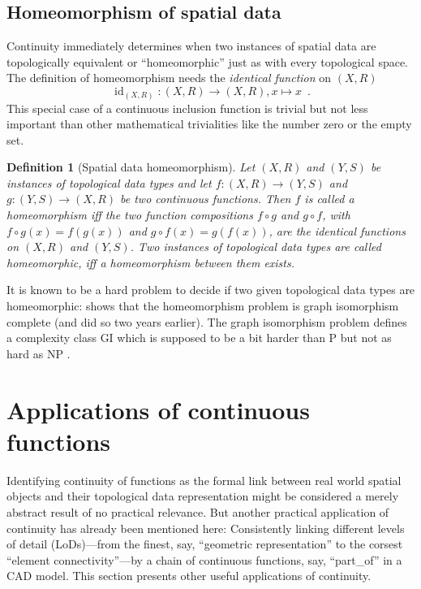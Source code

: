 \documentclass[5p]{elsarticle}
\newtheorem{dfn}{Definition}
\newcommand{\qq}[1]{``#1''}
\begin{document}
\subsection{Homeomorphism of spatial data} 

Continuity immediately determines when two instances of spatial data are 
topologically equivalent or \qq{homeomorphic} just as with every topological space. 
The definition of homeomorphism needs the \emph{identical function} on $(X,R)$ 
$$
  \operatorname{id}_{(X,R)}:(X,R)\to(X,R), x\mapsto x\enspace.
$$
This special case of a continuous inclusion function is trivial but not 
less important than other mathematical trivialities like the number zero or the empty set. 

\begin{sloppy} \begin{dfn}[Spatial data homeomorphism] Let $(X,R)$ and $(Y,S)$ be instances of topological 
data types and let 
${f:(X,R)\to(Y,S)}$ and 
${g:(Y,S)\to(X,R)}$ be two continuous functions. 
Then $f$ is called a \emph{homeomorphism} iff the two function compositions 
$f\circ g$ and $g\circ f$, with $f\circ g(x)=f(g(x))$ and $g\circ f(x)=g(f(x))$, 
are the identical functions on $(X,R)$ and $(Y,S)$. 
Two instances of topological data types are called \emph{homeomorphic}, iff a homeomorphism 
between them exists.
\end{dfn}
\end{sloppy} 

It is known to be a hard problem to decide if two given topological data types are homeomorphic: 
\cite{PaulDiss} shows that the homeomorphism problem is graph 
isomorphism complete (and \cite{BrettoEtAl:CompatibleTopologies} did so two years earlier). 
The graph isomorphism problem defines a complexity class GI which is supposed to be a bit harder 
than P but not as hard as NP \cite{Hoffmann:GI}. 

\section{Applications of continuous functions}\label{sec:applications}

Identifying continuity of functions as the formal link between real world spatial objects and 
their topological data representation might be considered a merely abstract result of no 
practical relevance. 
But another practical application of continuity has already been mentioned here: 
Consistently linking different levels of detail (LoDs)---from the finest, say,  
\qq{geometric representation} to the corsest \qq{element connectivity}---by 
a chain of continuous functions, say, \qq{part\_of} in a CAD model. 
This section presents other useful applications of continuity. 
\end{document}
